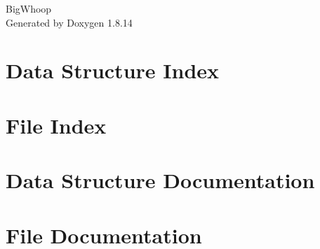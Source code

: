 \documentclass[twoside]{book}
\newcommand{\+}{\discretionary{\mbox{\scriptsize$\hookleftarrow$}}{}{}}
\newcommand{\clearemptydoublepage}{%
  \newpage{\pagestyle{empty}\cleardoublepage}%
}
\begin{document}
\hypersetup{pageanchor=false,
             bookmarksnumbered=true,
             pdfencoding=unicode
            }
\begin{titlepage}
\vspace*{7cm}
\begin{center}%
{\Large Big\+Whoop }\\
\vspace*{1cm}
{\large Generated by Doxygen 1.8.14}\\
\end{center}
\end{titlepage}
\clearemptydoublepage
{}
\tableofcontents
\clearemptydoublepage
{}
\hypersetup{pageanchor=true}

\chapter{Data Structure Index}

\chapter{File Index}

\chapter{Data Structure Documentation}

\chapter{File Documentation}


\backmatter
\newpage
{}
\clearemptydoublepage
{}
\printindex
\end{document}
